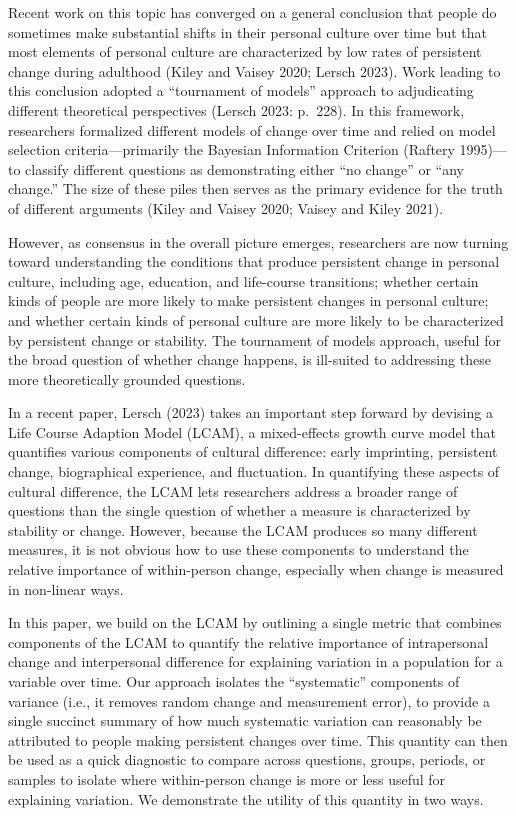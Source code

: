 \documentclass[
  12pt,
]{article}
\begin{document}
Recent work on this topic has converged on a general conclusion that
people do sometimes make substantial shifts in their personal culture
over time but that most elements of personal culture are characterized
by low rates of persistent change during adulthood (Kiley and Vaisey
2020; Lersch 2023). Work leading to this conclusion adopted a
``tournament of models'' approach to adjudicating different theoretical
perspectives (Lersch 2023: p.~228). In this framework, researchers
formalized different models of change over time and relied on model
selection criteria---primarily the Bayesian Information Criterion
(Raftery 1995)---to classify different questions as demonstrating either
``no change'' or ``any change.'' The size of these piles then serves as
the primary evidence for the truth of different arguments (Kiley and
Vaisey 2020; Vaisey and Kiley 2021).

However, as consensus in the overall picture emerges, researchers are
now turning toward understanding the conditions that produce persistent
change in personal culture, including age, education, and life-course
transitions; whether certain kinds of people are more likely to make
persistent changes in personal culture; and whether certain kinds of
personal culture are more likely to be characterized by persistent
change or stability. The tournament of models approach, useful for the
broad question of whether change happens, is ill-suited to addressing
these more theoretically grounded questions.

In a recent paper, Lersch (2023) takes an important step forward by
devising a Life Course Adaption Model (LCAM), a mixed-effects growth
curve model that quantifies various components of cultural difference:
early imprinting, persistent change, biographical experience, and
fluctuation. In quantifying these aspects of cultural difference, the
LCAM lets researchers address a broader range of questions than the
single question of whether a measure is characterized by stability or
change. However, because the LCAM produces so many different measures,
it is not obvious how to use these components to understand the relative
importance of within-person change, especially when change is measured
in non-linear ways.

In this paper, we build on the LCAM by outlining a single metric that
combines components of the LCAM to quantify the relative importance of
intrapersonal change and interpersonal difference for explaining
variation in a population for a variable over time. Our approach
isolates the ``systematic'' components of variance (i.e., it removes
random change and measurement error), to provide a single succinct
summary of how much systematic variation can reasonably be attributed to
people making persistent changes over time. This quantity can then be
used as a quick diagnostic to compare across questions, groups, periods,
or samples to isolate where within-person change is more or less useful
for explaining variation. We demonstrate the utility of this quantity in
two ways.
\end{document}
